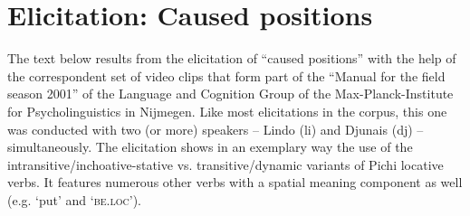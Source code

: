 \section{Elicitation: Caused positions}

The text below results from the elicitation of “caused positions” with the help of the correspondent set of video clips that form part of the “Manual for the field season 2001” of the Language and Cognition Group of the Max-Planck-Institute for Psycholinguistics in Nijmegen. Like most elicitations in the corpus, this one was conducted with two (or more) speakers – Lindo (li) and Djunais (dj) – simultaneously. The elicitation shows in an exemplary way the use of the intransitive/inchoative-stative vs. transitive/dynamic variants of Pichi locative verbs. It features numerous other verbs with a spatial meaning component as well (e.g.  ‘put’ and  \textsc{‘be.loc’}).

\setcounter{equation}{0}  %

